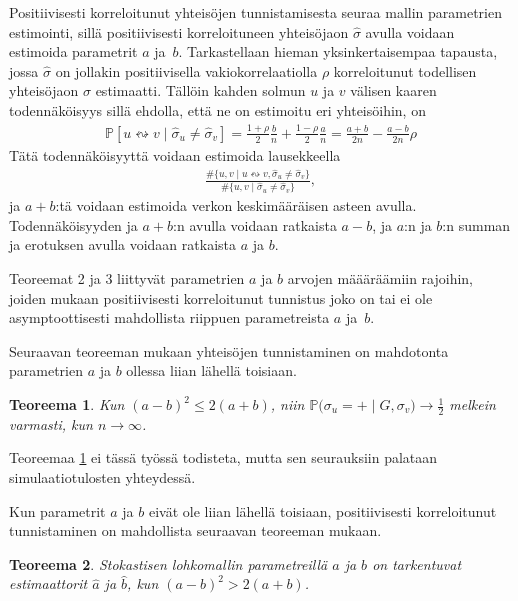 \documentclass[finnish,12pt,a4paper,pdftex,sci,utf8]{aaltothesis}
\newtheorem{teoreema}{Teoreema}
\begin{document}
Positiivisesti korreloitunut yhteisöjen tunnistamisesta seuraa mallin parametrien estimointi, sillä positiivisesti korreloituneen yhteisöjaon $\hat{\sigma}$ avulla voidaan estimoida parametrit $a$ ja $b$. Tarkastellaan hieman yksinkertaisempaa tapausta, jossa $\hat{\sigma}$ on jollakin positiivisella vakiokorrelaatiolla $\rho$ korreloitunut todellisen yhteisöjaon $\sigma$ estimaatti. Tällöin kahden solmun $u$ ja $v$ välisen kaaren todennäköisyys sillä ehdolla, että ne on estimoitu eri yhteisöihin, on
\begin{align*}
	\mathbb{P}[u \leftrightsquigarrow v \mid \hat{\sigma}_{u} \neq \hat{\sigma}_{v}] = \frac{1+\rho}{2} \frac{b}{n} + \frac{1-\rho}{2} \frac{a}{n} = \frac{a+b}{2n} - \frac{a-b}{2n} \rho
\end{align*}
Tätä todennäköisyyttä voidaan estimoida lausekkeella
\begin{align*}
	\frac{ \# \{ u,v \mid u \leftrightsquigarrow v, \hat{\sigma}_{u} \neq \hat{\sigma}_{v} \} }{ \# \{ u,v \mid \hat{\sigma}_{u} \neq \hat{\sigma}_{v} \} },
\end{align*}
ja $a+b$:tä voidaan estimoida verkon keskimääräisen asteen avulla. Todennäköisyyden ja $a+b$:n avulla voidaan ratkaista $a-b$, ja $a$:n ja $b$:n summan ja erotuksen avulla voidaan ratkaista $a$ ja $b$.

Teoreemat 2 ja 3 liittyvät parametrien $a$ ja $b$ arvojen määäräämiin rajoihin, joiden mukaan positiivisesti korreloitunut tunnistus joko on tai ei ole asymptoottisesti mahdollista riippuen parametreista $a$ ja $b$.

Seuraavan teoreeman mukaan yhteisöjen tunnistaminen on mahdotonta parametrien $a$ ja $b$ ollessa liian lähellä toisiaan.
\begin{teoreema}
	\label{teoreema:mahdottomuus}
	Kun $(a-b)^2 \leq 2(a+b)$, niin $\mathbb{P}\big( \sigma_u = + \mid G, \sigma_v \big) \rightarrow \frac{1}{2}$ melkein varmasti, kun $n \rightarrow \infty$. 
\end{teoreema}

Teoreemaa \ref{teoreema:mahdottomuus} ei tässä työssä todisteta, mutta sen seurauksiin palataan simulaatiotulosten yhteydessä.

Kun parametrit $a$ ja $b$ eivät ole liian lähellä toisiaan, positiivisesti korreloitunut tunnistaminen on mahdollista seuraavan teoreeman mukaan.
\begin{teoreema}
	\label{teoreema:tarkentuvatest}
	Stokastisen lohkomallin parametreillä $a$ ja $b$ on tarkentuvat estimaattorit $\hat{a}$ ja $\hat{b}$, kun $(a-b)^{2} > 2(a+b)$.
\end{teoreema}
\end{document}
